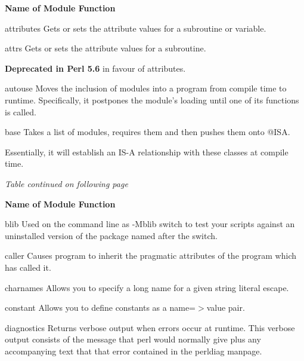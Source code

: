 \documentclass[a4paper,11pt]{book}
\begin{document}
\noindent \textbf{Name of Module Function}

\noindent 

\noindent attributes Gets or sets the attribute values for a subroutine or variable.

\noindent 

\noindent attrs Gets or sets the attribute values for a subroutine.

\noindent 

\noindent \textbf{Deprecated in Perl 5.6 }in favour of attributes.

\noindent 

\noindent autouse Moves the inclusion of modules into a program from compile time to runtime. Specifically, it postpones the module's loading until one of its functions is called.

\noindent 

\noindent base Takes a list of modules, requires them and then pushes them onto @ISA.

\noindent Essentially, it will establish an IS-A relationship with these classes at compile time.

\noindent \textit{Table continued on following page}

\noindent  

\noindent  

\noindent  

\noindent  

\noindent 

\noindent 

\noindent \textbf{Name of Module Function}

\noindent 

\noindent blib Used on the command line as -Mblib switch to test your scripts against an uninstalled version of the package named after the switch.

\noindent 

\noindent caller Causes program to inherit the pragmatic attributes of the program which has called it.

\noindent 

\noindent charnames Allows you to specify a long name for a given string literal escape.

\noindent 

\noindent constant Allows you to define constants as a name=$>$value pair.

\noindent 

\noindent diagnostics Returns verbose output when errors occur at runtime. This verbose output consists of the message that perl would normally give plus any accompanying text that that error contained in the perldiag manpage.
\end{document}
